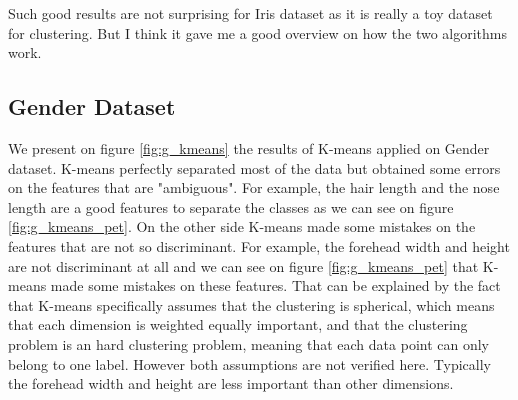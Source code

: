 \documentclass[twocolumn, 10pt]{article}
\begin{document}
			Such good results are not surprising for Iris dataset as it is really a toy dataset for clustering. But I think it gave me a good overview on how the two algorithms work.
		\subsection{Gender Dataset}
			We present on figure \ref{fig:g_kmeans} the results of K-means applied on Gender dataset. K-means perfectly separated most of the data but obtained some errors on the features that are "ambiguous". For example, the hair length and the nose length are a good features to separate the classes as we can see on figure \ref{fig:g_kmeans_pet}. On the other side K-means made some mistakes on the features that are not so discriminant. For example, the forehead width and height are not discriminant at all and we can see on figure \ref{fig:g_kmeans_pet} that K-means made some mistakes on these features. That can be explained by the fact that K-means specifically assumes that the clustering is spherical, which means that each dimension is weighted equally important, and that the clustering problem is an hard clustering problem, meaning that each data point can only belong to one label. However both assumptions are not verified here. Typically the forehead width and height are less important than other dimensions.
\end{document}
